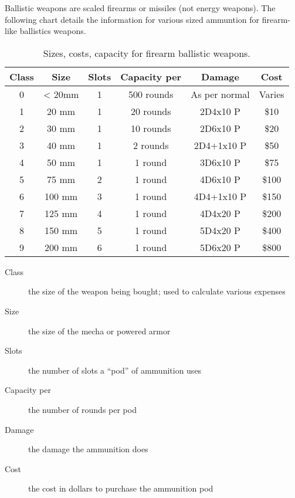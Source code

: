 Ballistic weapons are scaled firearms or missiles (not energy weapons).
The following chart details the information for various sized
ammuntion for firearm-like ballistics weapons.

\begin{table}[htb]
\begin{center}
\begin{tabular}{c|c|c|c|c|c}
\textbf{Class} & \textbf{Size} & \textbf{Slots} & \textbf{Capacity per} & \textbf{Damage} & \textbf{Cost} \\ \hline \hline
0 & < 20mm & 1 & 500 rounds & As per normal & Varies \\ \hline
1 & 20 mm & 1 & 20 rounds & 2D4x10 P & \$10 \\ \hline
2 & 30 mm & 1 & 10 rounds & 2D6x10 P & \$20 \\ \hline
3 & 40 mm & 1 & 2 rounds & 2D4+1x10 P & \$50 \\ \hline
4 & 50 mm & 1 & 1 round & 3D6x10 P & \$75 \\ \hline
5 & 75 mm & 2 & 1 round & 4D6x10 P & \$100 \\ \hline
6 & 100 mm & 3 & 1 round & 4D4+1x10 P & \$150 \\ \hline
7 & 125 mm & 4 & 1 round & 4D4x20 P & \$200 \\ \hline
8 & 150 mm & 5 & 1 round & 5D4x20 P & \$400 \\ \hline
9 & 200 mm & 6 & 1 round & 5D6x20 P & \$800 \\ \hline
\end{tabular}
\caption{Sizes, costs, capacity for firearm ballistic weapons.}
\end{center}
\end{table}

\begin{description}
\item[Class] the size of the weapon being bought; used to calculate various
expenses
\item[Size] the size of the mecha or powered armor
\item[Slots] the number of slots a ``pod'' of ammunition uses
\item[Capacity per] the number of rounds per pod
\item[Damage] the damage the ammunition does
\item[Cost] the cost in dollars to purchase the ammunition pod
\end{description}